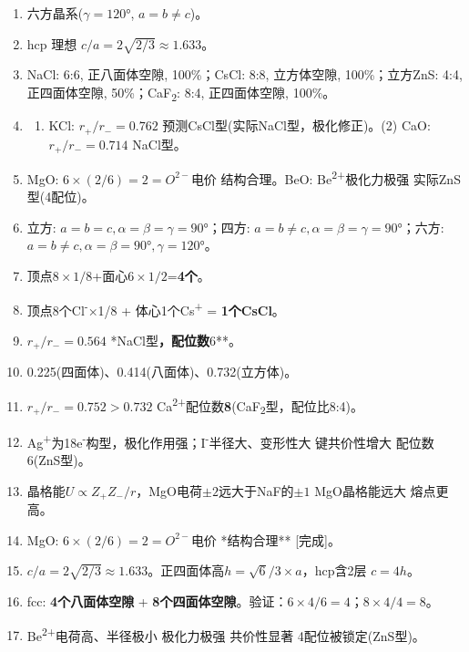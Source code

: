 \begin{enumerate}
\def\labelenumi{\arabic{enumi}.}
\item
  六方晶系(\(\gamma=120°\), \(a=b\neq c\))。
\item
  hcp 理想 \(c/a = 2\sqrt{2/3} \approx 1.633\)。
\item
  NaCl: 6:6, 正八面体空隙, 100\%；CsCl: 8:8, 立方体空隙, 100\%；立方ZnS: 4:4, 正四面体空隙, 50\%；CaF\textsubscript{2}: 8:4, 正四面体空隙, 100\%。
\item
  \begin{enumerate}
  \def\labelenumii{(\arabic{enumii})}
  \tightlist
  \item
    KCl: \(r_+/r_-=0.762\) \箭 预测CsCl型(实际NaCl型，极化修正)。(2) CaO: \(r_+/r_-=0.714\) \箭 NaCl型。
  \end{enumerate}
\item
  MgO: \(6\times(2/6)=2=O^{2-}\)电价 \箭 结构合理。BeO: Be\textsuperscript{2+}极化力极强 \箭 实际ZnS型(4配位)。
\item
  立方: \(a=b=c,\alpha=\beta=\gamma=90°\)；四方: \(a=b\neq c,\alpha=\beta=\gamma=90°\)；六方: \(a=b\neq c,\alpha=\beta=90°,\gamma=120°\)。
\item
  顶点\(8\times1/8\)+面心\(6\times1/2\)=\textbf{4个}。
\item
  顶点8个Cl\textsuperscript{-}×1/8 + 体心1个Cs\textsuperscript{+} = \textbf{1个CsCl}。
\item
  \(r_+/r_-=0.564\) \箭 **NaCl型\textbf{，配位数}6**。
\item
  0.225(四面体)、0.414(八面体)、0.732(立方体)。
\item
  \(r_+/r_-=0.752>0.732\) \箭 Ca\textsuperscript{2+}配位数\textbf{8}(CaF\textsubscript{2}型，配位比8:4)。
\item
  Ag\textsuperscript{+}为18e\textsuperscript{-}构型，极化作用强；I\textsuperscript{-}半径大、变形性大 \箭 键共价性增大 \箭 配位数6(ZnS型)。
\item
  晶格能\(U\propto Z_+Z_-/r\)，MgO电荷\(\pm2\)远大于NaF的\(\pm1\) \箭 MgO晶格能远大 \箭 熔点更高。
\item
  MgO: \(6\times(2/6)=2=O^{2-}\)电价 \箭 **结构合理** {[}完成{]}。
\item
  \(c/a=2\sqrt{2/3}\approx1.633\)。正四面体高\(h=\sqrt{6}/3\times a\)，hcp含2层 \箭 \(c=4h\)。
\item
  fcc: \textbf{4个八面体空隙} + \textbf{8个四面体空隙}。验证：\(6\times4/6=4\)；\(8\times4/4=8\)。
\item
  Be\textsuperscript{2+}电荷高、半径极小 \箭 极化力极强 \箭 共价性显著 \箭 4配位被锁定(ZnS型)。

\end{enumerate}
